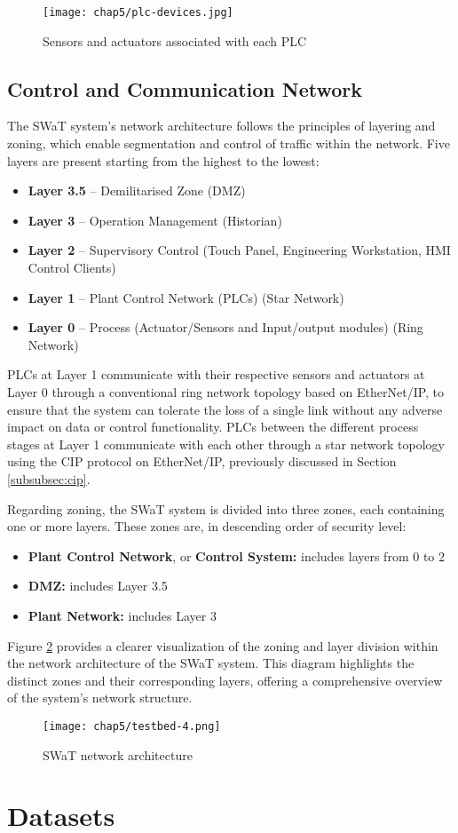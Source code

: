 \begin{figure}[ht]
	\centering
	\texttt{[image: chap5/plc-devices.jpg]}
	\caption{Sensors and actuators associated with each PLC}
	\label{fig:5_swat_sensors_plc}
\end{figure}

\subsection{Control and Communication Network}
\label{subsec:5_swat_network_architecture}
The SWaT system's network architecture follows the principles of layering and zoning, which enable segmentation and control of traffic within the network.
\newline \newline
Five layers are present starting from the highest to the lowest: 

\begin{itemize}
	\item \textbf{Layer 3.5} -- Demilitarised Zone (DMZ)
	\item \textbf{Layer 3} -- Operation Management (Historian)
	\item \textbf{Layer 2} -- Supervisory Control (Touch Panel, Engineering Workstation, HMI Control Clients)
	\item \textbf{Layer 1} -- Plant Control Network (PLCs) (Star Network)
	\item \textbf{Layer 0} -- Process (Actuator/Sensors and Input/output modules) (Ring Network)
\end{itemize}
PLCs at Layer 1 communicate with their respective sensors and actuators at Layer 0 through a conventional ring network topology based on EtherNet/IP, to ensure that the system can tolerate the loss of a single link without any adverse impact on data or control functionality.\newline
PLCs between the different process stages at Layer 1 communicate with each other through a star network topology using the CIP protocol on EtherNet/IP, previously discussed in Section \ref{subsubsec:cip}.

\bigskip
Regarding zoning, the SWaT system is divided into three zones, each containing one or more layers. These zones are, in descending order of security level: 

\begin{itemize}
	\item \textbf{Plant Control Network}, or \textbf{Control System:} includes layers from 0 to 2
	\item \textbf{DMZ:} includes Layer 3.5
	\item \textbf{Plant Network:} includes Layer 3
\end{itemize}
Figure \ref{fig:5_swat_network_arch} provides a clearer visualization of the zoning and layer division within the network architecture of the SWaT system. This diagram highlights the distinct zones and their corresponding layers, offering a comprehensive overview of the system's network structure.

\begin{figure}[ht]
	\centering
	\texttt{[image: chap5/testbed-4.png]}
	\caption{SWaT network architecture}
	\label{fig:5_swat_network_arch}
\end{figure}

\section{Datasets}
\label{sec:5_swat_datasets}

\vfill
\nolinenumbers